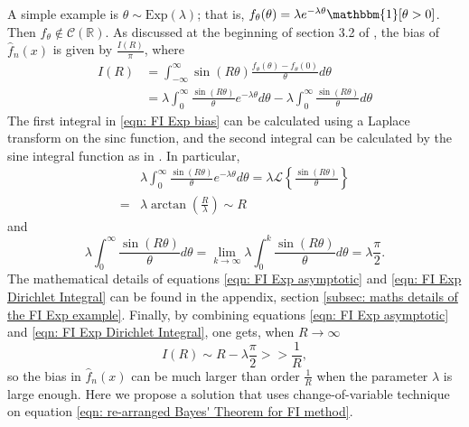 \documentclass[%
 reprint,
 amsmath,amssymb,
 aps,
]{revtex4-2}
\def\R{\mathbb{R}}
\begin{document}
A simple example is $\theta \sim \text{Exp}(\lambda)$; that is, $f_\theta(\theta) = \lambda e^{-\lambda \theta} \mathbbm{1}[\theta > 0]$. Then $f_\theta \notin \mathcal{C}(\R)$. As discussed at the beginning of section 3.2 of \cite{rotiroti2022computing}, the bias of $\hat{f}_n(x)$ is given by $\displaystyle \frac{I(R)}{\pi}$, where
\begin{align} \label{eqn: FI Exp bias}
    I(R) & = \int_{-\infty}^\infty \sin(R\theta) \frac{f_\theta(\theta) - f_\theta(0)}{\theta} d\theta \\
    & = \lambda \int_0^\infty \frac{\sin(R\theta)}{\theta} e^{-\lambda \theta} d\theta - \lambda \int_0^\infty \frac{\sin(R\theta)}{\theta} d\theta
\end{align}
The first integral in \eqref{eqn: FI Exp bias} can be calculated using a Laplace transform on the sinc function, and the second integral can be calculated by the sine integral function as in \cite{rotiroti2022computing}. In particular,
\begin{align} \label{eqn: FI Exp asymptotic}
    & \lambda \int_0^\infty \frac{\sin(R\theta)}{\theta} e^{-\lambda \theta} d\theta = \lambda \mathcal{L}\left\{\frac{\sin(R\theta)}{\theta} \right\} \\
    = & \lambda \arctan\left(\frac{R}{\lambda}\right) \sim R
\end{align}
and
\begin{equation} \label{eqn: FI Exp Dirichlet Integral}
    \lambda \int_0^\infty \frac{\sin(R\theta)}{\theta} d\theta = \lim_{k \to \infty} \lambda \int_0^k \frac{\sin(R\theta)}{\theta} d\theta = \lambda\frac{\pi}{2}.
\end{equation}
The mathematical details of equations \eqref{eqn: FI Exp asymptotic} and \eqref{eqn: FI Exp Dirichlet Integral} can be found in the appendix, section \ref{subsec: maths details of the FI Exp example}. Finally, by combining equations \eqref{eqn: FI Exp asymptotic} and \eqref{eqn: FI Exp Dirichlet Integral}, one gets, when $R \to \infty$
\begin{equation} \label{eqn: FI Exp bias I component}
    I(R) \sim R - \lambda \frac{\pi}{2} >> \frac{1}{R},
\end{equation}
so the bias in $\hat{f}_n(x)$ can be much larger than order $\frac{1}{R}$ when the parameter $\lambda$ is large enough. Here we propose a solution that uses change-of-variable technique on equation \eqref{eqn: re-arranged Bayes' Theorem for FI method}.
\end{document}
